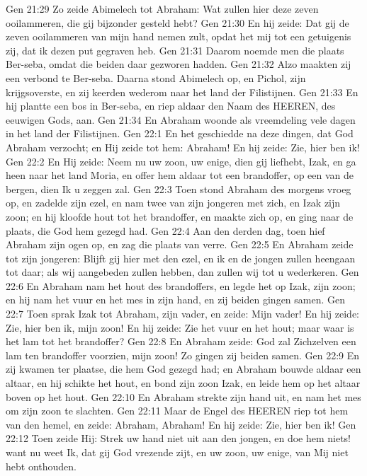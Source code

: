 Gen 21:29  Zo zeide Abimelech tot Abraham: Wat zullen hier deze zeven ooilammeren, die gij bijzonder gesteld hebt?
Gen 21:30  En hij zeide: Dat gij de zeven ooilammeren van mijn hand nemen zult, opdat het mij tot een getuigenis zij, dat ik dezen put gegraven heb.
Gen 21:31  Daarom noemde men die plaats Ber-seba, omdat die beiden daar gezworen hadden.
Gen 21:32  Alzo maakten zij een verbond te Ber-seba. Daarna stond Abimelech op, en Pichol, zijn krijgsoverste, en zij keerden wederom naar het land der Filistijnen.
Gen 21:33  En hij plantte een bos in Ber-seba, en riep aldaar den Naam des HEEREN, des eeuwigen Gods, aan.
Gen 21:34  En Abraham woonde als vreemdeling vele dagen in het land der Filistijnen.
Gen 22:1  En het geschiedde na deze dingen, dat God Abraham verzocht; en Hij zeide tot hem: Abraham! En hij zeide: Zie, hier ben ik!
Gen 22:2  En Hij zeide: Neem nu uw zoon, uw enige, dien gij liefhebt, Izak, en ga heen naar het land Moria, en offer hem aldaar tot een brandoffer, op een van de bergen, dien Ik u zeggen zal.
Gen 22:3  Toen stond Abraham des morgens vroeg op, en zadelde zijn ezel, en nam twee van zijn jongeren met zich, en Izak zijn zoon; en hij kloofde hout tot het brandoffer, en maakte zich op, en ging naar de plaats, die God hem gezegd had.
Gen 22:4  Aan den derden dag, toen hief Abraham zijn ogen op, en zag die plaats van verre.
Gen 22:5  En Abraham zeide tot zijn jongeren: Blijft gij hier met den ezel, en ik en de jongen zullen heengaan tot daar; als wij aangebeden zullen hebben, dan zullen wij tot u wederkeren.
Gen 22:6  En Abraham nam het hout des brandoffers, en legde het op Izak, zijn zoon; en hij nam het vuur en het mes in zijn hand, en zij beiden gingen samen.
Gen 22:7  Toen sprak Izak tot Abraham, zijn vader, en zeide: Mijn vader! En hij zeide: Zie, hier ben ik, mijn zoon! En hij zeide: Zie het vuur en het hout; maar waar is het lam tot het brandoffer?
Gen 22:8  En Abraham zeide: God zal Zichzelven een lam ten brandoffer voorzien, mijn zoon! Zo gingen zij beiden samen.
Gen 22:9  En zij kwamen ter plaatse, die hem God gezegd had; en Abraham bouwde aldaar een altaar, en hij schikte het hout, en bond zijn zoon Izak, en leide hem op het altaar boven op het hout.
Gen 22:10  En Abraham strekte zijn hand uit, en nam het mes om zijn zoon te slachten.
Gen 22:11  Maar de Engel des HEEREN riep tot hem van den hemel, en zeide: Abraham, Abraham! En hij zeide: Zie, hier ben ik!
Gen 22:12  Toen zeide Hij: Strek uw hand niet uit aan den jongen, en doe hem niets! want nu weet Ik, dat gij God vrezende zijt, en uw zoon, uw enige, van Mij niet hebt onthouden.
